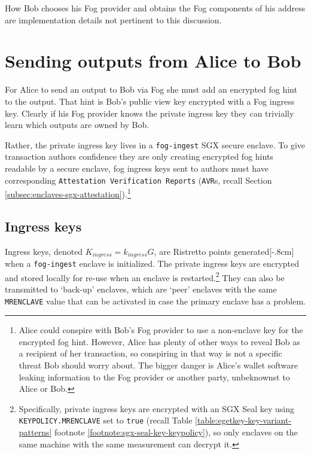 How Bob chooses his Fog provider and obtains the Fog components of his address are implementation details not pertinent to this discussion.%



\section{Sending outputs from Alice to Bob}
\label{sec:fog-sending-outputs-alice-to-bob}

For Alice to send an output to Bob via Fog she must add an encrypted fog hint to the output. That hint is Bob's public view key encrypted with a Fog ingress key. Clearly if his Fog provider knows the private ingress key they can trivially learn which outputs are owned by Bob.

Rather, the private ingress key lives in a {\tt fog-ingest} SGX secure enclave. To give transaction authors confidence they are only creating encrypted fog hints readable by a secure enclave, fog ingress keys sent to authors must have corresponding {\tt Attestation Verification Reports} ({\tt AVR}s, recall Section \ref{subsec:enclaves-sgx-attestation}).\footnote{Alice could conspire with Bob's Fog provider to use a non-enclave key for the encrypted fog hint. However, Alice has plenty of other ways to reveal Bob as a recipient of her transaction, so conspiring in that way is not a specific threat Bob should worry about. The bigger danger is Alice's wallet software leaking information to the Fog provider or another party, unbeknownst to Alice or Bob.}


\subsection{Ingress keys}
\label{subsec:fog-ingress-keys}

Ingress keys, denoted $K_{ingress} = k_{ingress} G$, are Ristretto points generated[-.8cm] when a {\tt fog-ingest} enclave is initialized. The private ingress keys are encrypted and stored locally for re-use when an enclave is restarted.\footnote{Specifically, private ingress keys are encrypted with an SGX Seal key using {\tt KEYPOLICY.MRENCLAVE} set to {\tt true} (recall Table \ref{table:egetkey-key-variant-patterns} footnote \ref{footnote:sgx-seal-key-keypolicy}), so only enclaves on the same machine with the same measurement can decrypt it.} They can also be transmitted to `back-up' enclaves, which are `peer' enclaves with the same {\tt MRENCLAVE} value that can be activated in case the primary enclave has a problem.%

